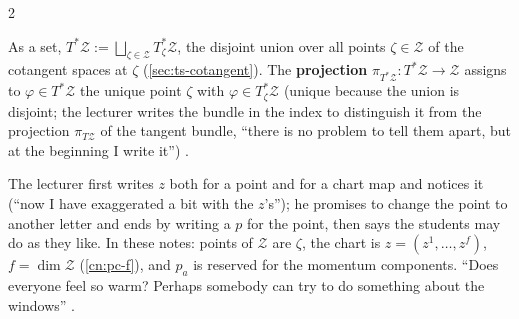 \begin{paracol}{2}
\begin{definition}\label{def:hq-cotangent}
As a set, $T^*\mathcal Z:=\bigsqcup_{\zeta\in\mathcal Z}T^*_\zeta\mathcal Z$, the disjoint union over all points $\zeta\in\mathcal Z$ of the cotangent spaces at $\zeta$ (\cref{sec:ts-cotangent}). The \textbf{projection} $\pi_{T^*\mathcal Z}\colon T^*\mathcal Z\to\mathcal Z$ assigns to $\varphi\in T^*\mathcal Z$ the unique point $\zeta$ with $\varphi\in T^*_\zeta\mathcal Z$ (unique because the union is disjoint; the lecturer writes the bundle in the index to distinguish it from the projection $\pi_{T\mathcal Z}$ of the tangent bundle, ``there is no problem to tell them apart, but at the beginning I write it'') .
\end{definition}
\begin{coursenote}\label{cn:hq-letters}
The lecturer first writes $z$ both for a point and for a chart map and notices it (``now I have exaggerated a bit with the $z$'s''); he promises to change the point to another letter and ends by writing a $p$ for the point, then says the students may do as they like. In these notes: points of $\mathcal Z$ are $\zeta$, the chart is $z=(z^1,\dots,z^f)$, $f=\dim\mathcal Z$ (\cref{cn:pc-f}), and $p_a$ is reserved for the momentum components. ``Does everyone feel so warm? Perhaps somebody can try to do something about the windows'' .
\end{coursenote}


\end{paracol}
